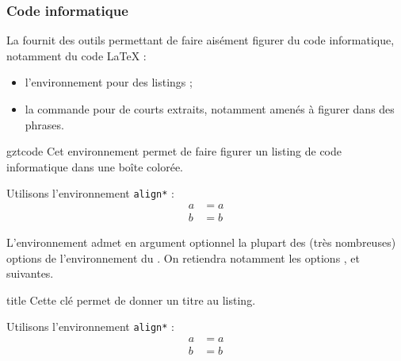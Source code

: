 \subsubsection{Code informatique}
\label{sec:commande-pour-code}

La \gztauthorcl{} fournit des outils permettant de faire aisément figurer du
code informatique, notamment du code \LaTeX{} :
\begin{itemize}
\item l'environnement  pour des listings ;
\item la commande  pour de courts extraits, notamment amenés
  à figurer dans des phrases.
\end{itemize}

\begin{docEnvironment}[doclang/environment content=listing]{gztcode}{}
  Cet environnement permet de faire figurer un listing de code informatique dans
  une boîte colorée.
\end{docEnvironment}

\begin{bodycode}
  \begin{gztcode}
    Utilisons l'environnement \verb|align*| :
    \begin{align*}
      a & = a\\
      b & = b
    \end{align*}
  \end{gztcode}
\end{bodycode}

L'environnement  admet en argument optionnel la plupart des
(très nombreuses) options de l'environnement  du
. On retiendra notamment les options ,
 et  suivantes.

\begin{docKey}{title}{}{}
  Cette clé permet de donner un titre au listing.
\end{docKey}

\begin{bodycode}[listing and text,listing options={morekeywords={[2]title}}]
  \begin{gztcode}[title=Alignement d'équations]
    Utilisons l'environnement \verb|align*| :
    \begin{align*}
      a & = a\\
      b & = b
    \end{align*}
  \end{gztcode}
\end{bodycode}

